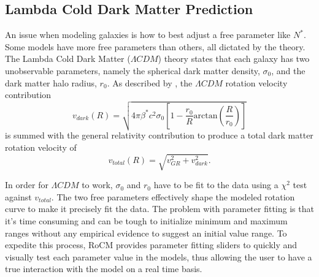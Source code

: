 \documentclass[conference]{IEEEtran-modified}
\begin{document}
\subsection{Lambda Cold Dark Matter Prediction}
An issue when modeling galaxies is how to best adjust a free parameter like $N^*$. Some models have more free parameters than others, all dictated by the theory. The Lambda Cold Dark Matter ($\Lambda CDM$) theory states that each galaxy has two unobservable parameters, namely the spherical dark matter density, $\sigma_0$, and the dark matter halo radius, $r_0$. As described by \cite{mannheim}, the $\Lambda CDM$ rotation velocity contribution
\begin{equation}
v_{dark}(R) = \sqrt{4\pi\beta^*c^2\sigma_0\left[1-\frac{r_0}{R}\text{arctan}\left(\frac{R}{r_0}\right)\right]}
\end{equation}
is summed with the general relativity contribution to produce a total dark matter rotation velocity of 
\begin{equation}
v_{total}(R) = \sqrt{v_{GR}^2 + v_{dark}^2}.
\end{equation}

In order for $\Lambda CDM$ to work, $\sigma_0$ and $r_0$ have to be fit to the data using a $\chi^2$ test against $v_{total}$. The two free parameters effectively shape the modeled rotation curve to make it precisely fit the data. The problem with parameter fitting is that it's time consuming and can be tough to initialize minimum and maximum ranges without any empirical evidence to suggest an initial value range. To expedite this process, RoCM provides parameter fitting sliders to quickly and visually test each parameter value in the models, thus allowing the user to have a true interaction with the model on a real time basis.
\end{document}
